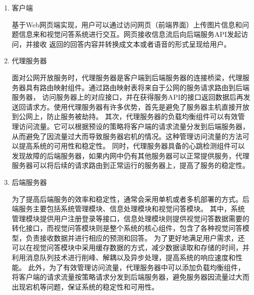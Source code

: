 \begin{enumerate}[topsep = 0 pt, itemsep= 0 pt, parsep=0pt, partopsep=0pt, leftmargin=0pt, itemindent=44pt, labelsep=6pt,  listparindent=22pt, label=(\arabic*)]
	\item 客户端
	
	基于Web网页端实现，用户可以通过访问网页（前端界面）上传图片信息和问题信息来和视觉问答系统进行交互。网页接收信息流后向后端服务API发起访问，并接收
	返回的回答内容并转换成文本或者语音的形式呈现给用户。
	\item 代理服务器

	面对公网开放服务时，代理服务器是客户端到后端服务器的连接桥梁，代理服务器具有路由映射组件。通过路由映射表将来自于公网的服务请求路由到后端服务器，
	访问服务器上的对应接口，并在获得服务API的接口返回数据后再发送回请求方。使用代理服务器有许多优势，首先是避免了服务器主机直接开放到公网上，防止服务被劫持。
	其次，代理服务器的负载均衡组件可以有效管理访问流量。它可以根据预设的策略将客户端的请求流量分发到后端服务器，从而避免了因流量过大而导致服务器宕机的情况。这种管理访问流量的方法可以提高系统的可用性和稳定性。
	同时，代理服务器具备的心跳检测组件可以发现故障的后端服务器，如果内网中仍有其他服务器可以正常提供服务，代理服务器可以将后续的请求路由到正常运行的服务器上，提高了服务的稳定性。
	\item 后端服务器
	
	为了提高后端服务的效率和稳定性，通常会采用单机或者多机部署的方式。后端服务主要包括系统管理模块、信息处理模块和视觉问答模块。
	其中，系统管理模块提供用户注册登录等接口，信息处理模块则提供视觉问答数据需要的转化接口，而视觉问答模块则是整个系统的核心组件，包含了各种视觉问答模型，负责接收数据并进行相应的预测和回答。
	为了更好地满足用户需求，还可以在视觉问答模块中采用缓存数据的方式，减少数据读取和存储的时间，并利用消息队列技术进行削峰、解耦以及异步处理，提高系统的响应速度和性能。
	此外，为了有效管理访问流量，代理服务器中可以添加负载均衡组件，将客户端的请求流量按策略请求分发到后端服务器，避免服务器因流量过大而出现宕机等问题，保证系统的稳定性和可用性。
\end{enumerate}

